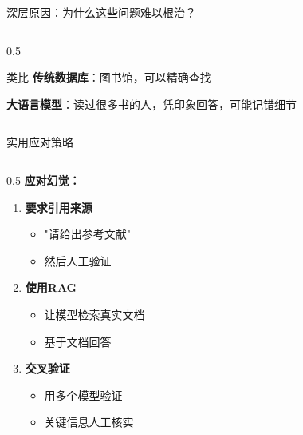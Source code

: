 \documentclass[aspectratio=169,11pt]{beamer}
\begin{document}
\begin{frame}{深层原因：为什么这些问题难以根治？}
\begin{columns}
\begin{column}{0.5\textwidth}
            \vspace{0.3cm}
            \begin{block}{类比}
                \small
                \textbf{传统数据库}：图书馆，可以精确查找
                
                \vspace{0.1cm}
                \textbf{大语言模型}：读过很多书的人，凭印象回答，可能记错细节
            \end{block}
        \end{column}
    \end{columns}
\end{frame}

\begin{frame}{实用应对策略}
    \begin{columns}
        \begin{column}{0.5\textwidth}
            \textbf{应对幻觉：}
            \begin{enumerate}
                \item \textbf{要求引用来源}
                    \begin{itemize}
                        \item "请给出参考文献"
                        \item 然后人工验证
                    \end{itemize}
                \item \textbf{使用RAG}
                    \begin{itemize}
                        \item 让模型检索真实文档
                        \item 基于文档回答
                    \end{itemize}
                \item \textbf{交叉验证}
                    \begin{itemize}
                        \item 用多个模型验证
                        \item 关键信息人工核实
                    \end{itemize}
            \end{enumerate}
            

\end{column}
\end{columns}
\end{frame}
\end{document}
